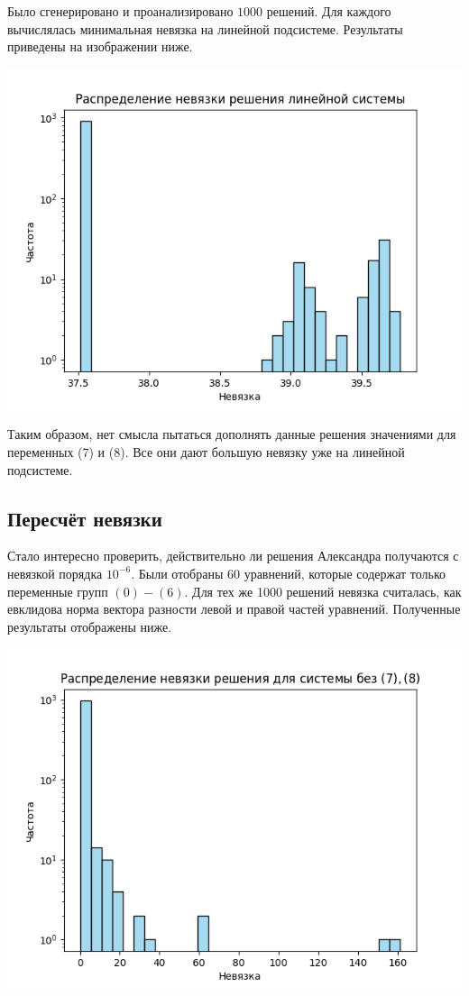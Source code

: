 \documentclass[12pt]{article}
\begin{document}
    Было сгенерировано и проанализировано $ 1000 $ решений.
    Для каждого вычислялась минимальная невязка на линейной подсистеме.
    Результаты приведены на изображении ниже.

    \includegraphics{linear.png}

    Таким образом, нет смысла пытаться дополнять данные решения значениями для переменных (7) и (8).
    Все они дают большую невязку уже на линейной подсистеме.

    \subsection{Пересчёт невязки}

    Стало интересно проверить, действительно ли решения Александра получаются с невязкой порядка $ 10^{-6} $.
    Были отобраны 60 уравнений, которые содержат только переменные групп $ (0)-(6) $.
    Для тех же 1000 решений невязка считалась, как евклидова норма вектора разности левой и правой частей уравнений.
    Полученные результаты отображены ниже.

    \includegraphics{prev.png}
\end{document}
